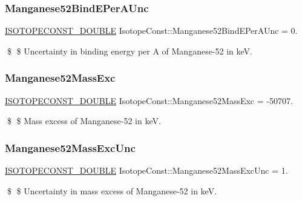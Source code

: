 \subsubsection{\texorpdfstring{Manganese52\+Bind\+E\+Per\+A\+Unc}{Manganese52BindEPerAUnc}}
{\footnotesize\ttfamily \mbox{\hyperlink{group___isotope_const-_macros_ga8f45a7272ce02c0b4c65c44636ed719a}{I\+S\+O\+T\+O\+P\+E\+C\+O\+N\+S\+T\+\_\+\+D\+O\+U\+B\+LE}} Isotope\+Const\+::\+Manganese52\+Bind\+E\+Per\+A\+Unc = 0.}

\$ \$ Uncertainty in binding energy per A of Manganese-\/52 in keV. \mbox{\label{group___isotope_const-_manganese-_mn52_ga878b6ae7fc3ab793e0532a4e51edf019}} 
\subsubsection{\texorpdfstring{Manganese52\+Mass\+Exc}{Manganese52MassExc}}
{\footnotesize\ttfamily \mbox{\hyperlink{group___isotope_const-_macros_ga8f45a7272ce02c0b4c65c44636ed719a}{I\+S\+O\+T\+O\+P\+E\+C\+O\+N\+S\+T\+\_\+\+D\+O\+U\+B\+LE}} Isotope\+Const\+::\+Manganese52\+Mass\+Exc = -\/50707.}

\$ \$ Mass excess of Manganese-\/52 in keV. \mbox{\label{group___isotope_const-_manganese-_mn52_ga5441f0eb5629cc3e1736b6664cc11ac4}} 
\subsubsection{\texorpdfstring{Manganese52\+Mass\+Exc\+Unc}{Manganese52MassExcUnc}}
{\footnotesize\ttfamily \mbox{\hyperlink{group___isotope_const-_macros_ga8f45a7272ce02c0b4c65c44636ed719a}{I\+S\+O\+T\+O\+P\+E\+C\+O\+N\+S\+T\+\_\+\+D\+O\+U\+B\+LE}} Isotope\+Const\+::\+Manganese52\+Mass\+Exc\+Unc = 1.}

\$ \$ Uncertainty in mass excess of Manganese-\/52 in keV. \mbox{\label{group___isotope_const-_manganese-_mn52_gad426638b54bfae6fd799acc88682e50a}} 
